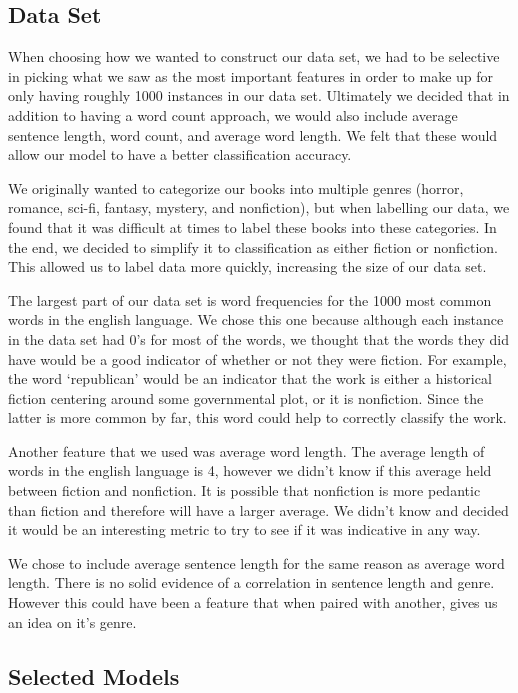 \documentclass{article}
\begin{document}
\subsection{Data Set}
When choosing how we wanted to construct our data set, we had to be selective in picking what we saw as the most important features in order to make up for only having roughly 1000 instances in our data set. Ultimately we decided that in addition to having a word count approach, we would also include average sentence length, word count, and average word length. We felt that these would allow our model to have a better classification accuracy.\par
We originally wanted to categorize our books into multiple genres (horror, romance, sci-fi, fantasy, mystery, and nonfiction), but when labelling our data, we found that it was difficult at times to label these books into these categories. In the end, we decided to simplify it to classification as either fiction or nonfiction. This allowed us to label data more quickly, increasing the size of our data set.\par
The largest part of our data set is word frequencies for the 1000 most common words in the english language. We chose this one because although each instance in the data set had 0’s for most of the words, we thought that the words they did have would be a good indicator of whether or not they were fiction. For example, the word ‘republican’ would be an indicator that the work is either a historical fiction centering around some governmental plot, or it is nonfiction. Since the latter is more common by far, this word could help to correctly classify the work.\par
Another feature that we used was average word length. The average length of words in the english language is 4, however we didn’t know if this average held between fiction and nonfiction. It is possible that nonfiction is more pedantic than fiction and therefore will have a larger average. We didn’t know and decided it would be an interesting metric to try to see if it was indicative in any way.\par
We chose to include average sentence length for the same reason as average word length. There is no solid evidence of a correlation in sentence length and genre. However this could have been a feature that when paired with another, gives us an idea on it’s genre.


\subsection{Selected Models}
\end{document}
